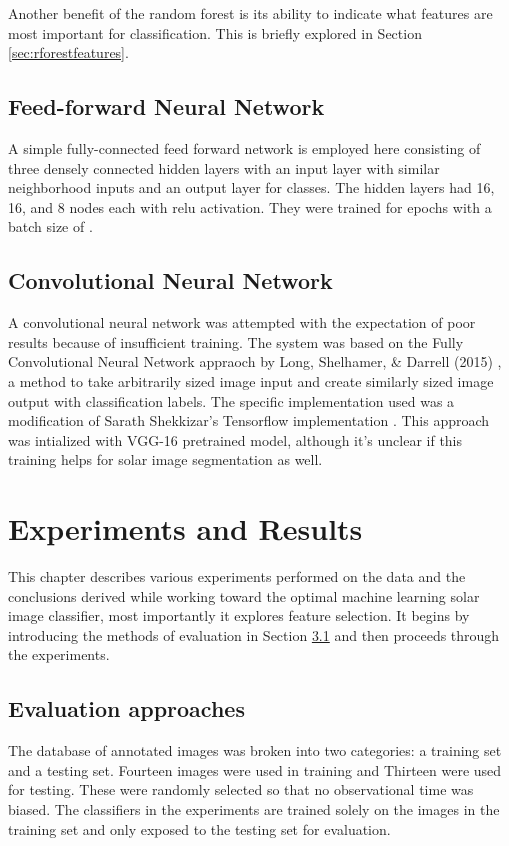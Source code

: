 \documentclass[twoside]{report}
\newcommand{\todo}[1]{{\color{red}{\textbf{#1}}}}
\begin{document}
Another benefit of the random forest is its ability to indicate what features are most important for classification. This is briefly explored in Section \ref{sec:rforestfeatures}. 

\section{Feed-forward Neural Network}
A simple fully-connected feed forward network is employed here consisting of three densely connected hidden layers with an input layer with similar neighborhood inputs and an output layer for classes. The hidden layers had 16, 16, and 8 nodes \todo{change to optimal} each with relu activation. They were trained for \todo{this many} epochs with a batch size of \todo{this many}. 

\section{Convolutional Neural Network}
A convolutional neural network was attempted with the expectation of poor results because of insufficient training. The system was based on the Fully Convolutional Neural Network appraoch by Long, Shelhamer, \& Darrell (2015) \cite{fcnn}, a method to take arbitrarily sized image input and create similarly sized image output with classification labels. The specific implementation used was a modification of Sarath Shekkizar's Tensorflow implementation \cite{fcnntensorflow}. This approach was intialized with VGG-16 pretrained model, although it's unclear if this training helps for solar image segmentation as well. 

\chapter{Experiments and Results} \label{ch:experiments}

This chapter describes various experiments performed on the data and the conclusions derived while working toward the optimal machine learning solar image classifier, most importantly it explores feature selection. It begins by introducing the methods of evaluation in Section \ref{sec:evaluationmethods} and then proceeds through the experiments. 

\section{Evaluation approaches}\label{sec:evaluationmethods}
The database of annotated images was broken into two categories: a training set and a testing set. Fourteen images were used in training and Thirteen were used for testing. These were randomly selected so that no observational time was biased. The classifiers in the experiments are trained solely on the images in the training set and only exposed to the testing set for evaluation. 
\end{document}
